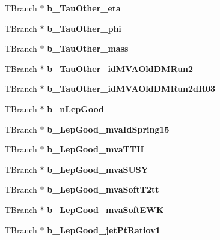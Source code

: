 \begin{DoxyCompactItemize}
T\+Branch $\ast$ {\bfseries b\+\_\+\+Tau\+Other\+\_\+eta}
\item 
\hypertarget{classMiniTree_a4bfefa7efcdbbcc9428a3abf1b91394f}{}\label{classMiniTree_a4bfefa7efcdbbcc9428a3abf1b91394f} 
T\+Branch $\ast$ {\bfseries b\+\_\+\+Tau\+Other\+\_\+phi}
\item 
\hypertarget{classMiniTree_ae7c6ca7cc54b677e57fca7589c7a2571}{}\label{classMiniTree_ae7c6ca7cc54b677e57fca7589c7a2571} 
T\+Branch $\ast$ {\bfseries b\+\_\+\+Tau\+Other\+\_\+mass}
\item 
\hypertarget{classMiniTree_a19f9bf060ab9cee18aad7d43de774a4a}{}\label{classMiniTree_a19f9bf060ab9cee18aad7d43de774a4a} 
T\+Branch $\ast$ {\bfseries b\+\_\+\+Tau\+Other\+\_\+id\+M\+V\+A\+Old\+D\+M\+Run2}
\item 
\hypertarget{classMiniTree_a3f317d8f23fbece2148121289598b099}{}\label{classMiniTree_a3f317d8f23fbece2148121289598b099} 
T\+Branch $\ast$ {\bfseries b\+\_\+\+Tau\+Other\+\_\+id\+M\+V\+A\+Old\+D\+M\+Run2d\+R03}
\item 
\hypertarget{classMiniTree_a55ae3a8821923ce44a09d8f29e2282cf}{}\label{classMiniTree_a55ae3a8821923ce44a09d8f29e2282cf} 
T\+Branch $\ast$ {\bfseries b\+\_\+n\+Lep\+Good}
\item 
\hypertarget{classMiniTree_af5a47347d05b334356befd6a78561f88}{}\label{classMiniTree_af5a47347d05b334356befd6a78561f88} 
T\+Branch $\ast$ {\bfseries b\+\_\+\+Lep\+Good\+\_\+mva\+Id\+Spring15}
\item 
\hypertarget{classMiniTree_a3e57402e3b79d4a7d6909dd8d67cac80}{}\label{classMiniTree_a3e57402e3b79d4a7d6909dd8d67cac80} 
T\+Branch $\ast$ {\bfseries b\+\_\+\+Lep\+Good\+\_\+mva\+T\+TH}
\item 
\hypertarget{classMiniTree_ac36c8d3ea46855949bbc7498f53bdac5}{}\label{classMiniTree_ac36c8d3ea46855949bbc7498f53bdac5} 
T\+Branch $\ast$ {\bfseries b\+\_\+\+Lep\+Good\+\_\+mva\+S\+U\+SY}
\item 
\hypertarget{classMiniTree_a1fd51932f522294fa4f61d59addcca94}{}\label{classMiniTree_a1fd51932f522294fa4f61d59addcca94} 
T\+Branch $\ast$ {\bfseries b\+\_\+\+Lep\+Good\+\_\+mva\+Soft\+T2tt}
\item 
\hypertarget{classMiniTree_a994c7f6c5291af2be9ace94e75ddf0af}{}\label{classMiniTree_a994c7f6c5291af2be9ace94e75ddf0af} 
T\+Branch $\ast$ {\bfseries b\+\_\+\+Lep\+Good\+\_\+mva\+Soft\+E\+WK}
\item 
\hypertarget{classMiniTree_a715a3dc57397a6c795d54a6bf853328b}{}\label{classMiniTree_a715a3dc57397a6c795d54a6bf853328b} 
T\+Branch $\ast$ {\bfseries b\+\_\+\+Lep\+Good\+\_\+jet\+Pt\+Ratiov1}

\end{DoxyCompactItemize}
